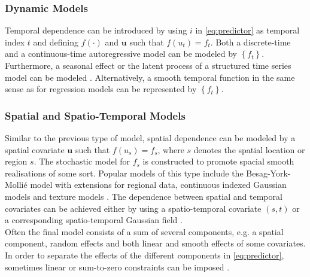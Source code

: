 \subsubsection{Dynamic Models}
Temporal dependence can be introduced by using $i$ in \eqref{eq:predictor} as temporal index $t$ and defining $f\left(\cdot\right)$ and $\pmb{u}$ such that $f\left(u_t\right)=f_t$. Both a discrete-time and a continuous-time autoregressive model can be modeled by $\left\lbrace f_t\right\rbrace$. Furthermore, a seasonal effect or the latent process of a structured time series model can be modeled \autocite[][]{kitagawa1996smoothness}. Alternatively, a smooth temporal function in the same sense as for regression models can be represented by $\left\lbrace f_t\right\rbrace$.
\subsubsection{Spatial and Spatio-Temporal Models}
Similar to the previous type of model, spatial dependence can be modeled by a spatial covariate $\pmb{u}$ such that $f\left(u_s\right)=f_s$, where $s$ denotes the spatial location or region $s$. The stochastic model for $f_s$ is constructed to promote spacial smooth realisations of some sort. Popular models of this type include the Besag-York-Mollié \autocite[][]{besag1991bayesian} model with extensions for regional data, continuous indexed Gaussian models \autocite[][]{banerjee2014hierarchical} and texture models \autocite[][]{marroquin2001gauss}. The dependence between spatial and temporal covariates can be achieved either by using a spatio-temporal covariate $(s,t)$ or a corresponding spatio-temporal Gaussian field \autocite[][]{kammann2003geoadditive}.\\
Often the final model consists of a sum of several components, e.g. a spatial component, random effects and both linear and smooth effects of some covariates. In order to separate the effects of the different components in \eqref{eq:predictor}, sometimes linear or sum-to-zero constraints can be imposed \autocite[][319--321]{rue2009approximate}.
